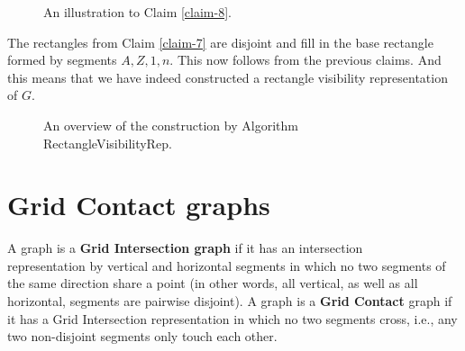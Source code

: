 \begin{figure}
	\begin{subfigure}{.45\textwidth}\centering
	\end{subfigure}
	\begin{subfigure}{.45\textwidth}\centering
		
	\end{subfigure}
	\caption{An illustration to Claim \ref{claim-8}.}
\end{figure}

\begin{claim}
	The rectangles from Claim \ref{claim-7} are disjoint and fill in the base rectangle formed by segments $A, Z, 1, n$. This now follows from the previous claims. And this means that we have indeed constructed a rectangle visibility representation of $G$.
\end{claim}

\begin{figure}[!ht]
	\begin{subfigure}{0.45\textwidth}\centering
		
	\end{subfigure}
	\begin{subfigure}{0.45\textwidth}\centering
		
	\end{subfigure}
	\caption{An overview of the construction by Algorithm RectangleVisibilityRep.}
\end{figure}

\section{Grid Contact graphs}

\begin{defn}
	A graph is a \textbf{Grid Intersection graph} if it has an intersection \\ representation by vertical and horizontal segments in which no two segments of the same direction share a point (in other words, all vertical, as well as all horizontal, segments are pairwise disjoint). A graph is a \textbf{Grid Contact} graph if it has a Grid Intersection representation in which no two segments cross, i.e., any two non-disjoint segments only touch each other.
\end{defn}

